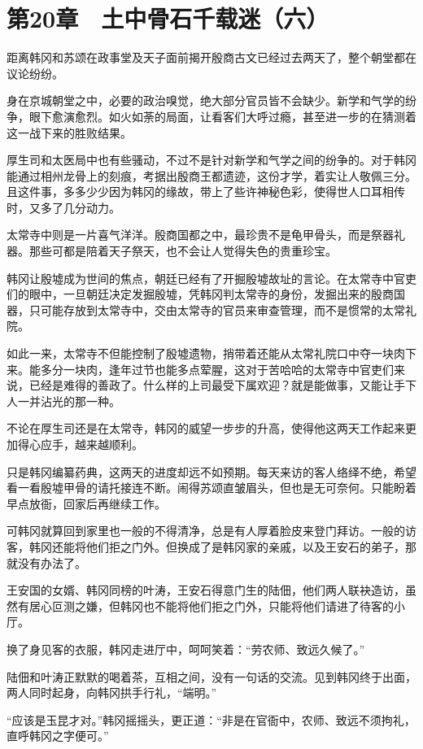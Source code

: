 \section{第20章　土中骨石千载迷（六）}

距离韩冈和苏颂在政事堂及天子面前揭开殷商古文已经过去两天了，整个朝堂都在议论纷纷。

身在京城朝堂之中，必要的政治嗅觉，绝大部分官员皆不会缺少。新学和气学的纷争，眼下愈演愈烈。如火如荼的局面，让看客们大呼过瘾，甚至进一步的在猜测着这一战下来的胜败结果。

厚生司和太医局中也有些骚动，不过不是针对新学和气学之间的纷争的。对于韩冈能通过相州龙骨上的刻痕，考据出殷商王都遗迹，这份才学，着实让人敬佩三分。且这件事，多多少少因为韩冈的缘故，带上了些许神秘色彩，使得世人口耳相传时，又多了几分动力。

太常寺中则是一片喜气洋洋。殷商国都之中，最珍贵不是龟甲骨头，而是祭器礼器。那些可都是陪着天子祭天，也不会让人觉得失色的贵重珍宝。

韩冈让殷墟成为世间的焦点，朝廷已经有了开掘殷墟故址的言论。在太常寺中官吏们的眼中，一旦朝廷决定发掘殷墟，凭韩冈判太常寺的身份，发掘出来的殷商国器，只可能存放到太常寺中，交由太常寺的官员来审查管理，而不是惯常的太常礼院。

如此一来，太常寺不但能控制了殷墟遗物，捎带着还能从太常礼院口中夺一块肉下来。能多分一块肉，逢年过节也能多点荤腥，这对于苦哈哈的太常寺中官吏们来说，已经是难得的善政了。什么样的上司最受下属欢迎？就是能做事，又能让手下人一并沾光的那一种。

不论在厚生司还是在太常寺，韩冈的威望一步步的升高，使得他这两天工作起来更加得心应手，越来越顺利。

只是韩冈编纂药典，这两天的进度却远不如预期。每天来访的客人络绎不绝，希望看一看殷墟甲骨的请托接连不断。闹得苏颂直皱眉头，但也是无可奈何。只能盼着早点放衙，回家后再继续工作。

可韩冈就算回到家里也一般的不得清净，总是有人厚着脸皮来登门拜访。一般的访客，韩冈还能将他们拒之门外。但换成了是韩冈家的亲戚，以及王安石的弟子，那就没有办法了。

王安国的女婿、韩冈同榜的叶涛，王安石得意门生的陆佃，他们两人联袂造访，虽然有居心叵测之嫌，但韩冈也不能将他们拒之门外，只能将他们请进了待客的小厅。

换了身见客的衣服，韩冈走进厅中，呵呵笑着：“劳农师、致远久候了。”

陆佃和叶涛正默默的喝着茶，互相之间，没有一句话的交流。见到韩冈终于出面，两人同时起身，向韩冈拱手行礼，“端明。”

“应该是玉昆才对。”韩冈摇摇头，更正道：“非是在官衙中，农师、致远不须拘礼，直呼韩冈之字便可。”

